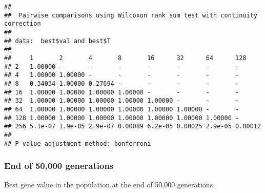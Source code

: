 \documentclass[]{book}
\begin{document}
\begin{verbatim}
## 
##  Pairwise comparisons using Wilcoxon rank sum test with continuity correction 
## 
## data:  best$val and best$T 
## 
##     1       2       4       8       16      32      64      128    
## 2   1.00000 -       -       -       -       -       -       -      
## 4   1.00000 1.00000 -       -       -       -       -       -      
## 8   0.34034 1.00000 0.27694 -       -       -       -       -      
## 16  1.00000 1.00000 1.00000 1.00000 -       -       -       -      
## 32  1.00000 1.00000 1.00000 1.00000 1.00000 -       -       -      
## 64  1.00000 1.00000 1.00000 1.00000 1.00000 1.00000 -       -      
## 128 1.00000 1.00000 1.00000 1.00000 1.00000 1.00000 1.00000 -      
## 256 5.1e-07 1.9e-05 2.9e-07 0.00089 6.2e-05 0.00025 2.9e-05 0.00012
## 
## P value adjustment method: bonferroni
\end{verbatim}

\hypertarget{end-of-50000-generations-13}{%
\subsubsection{End of 50,000 generations}\label{end-of-50000-generations-13}}

Best gene value in the population at the end of 50,000 generations.
\end{document}
